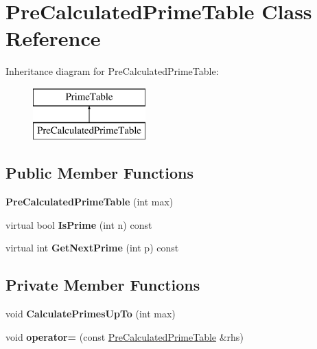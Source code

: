\hypertarget{class_pre_calculated_prime_table}{}\section{Pre\+Calculated\+Prime\+Table Class Reference}
\label{class_pre_calculated_prime_table}
Inheritance diagram for Pre\+Calculated\+Prime\+Table\+:\begin{figure}[H]
\begin{center}
\leavevmode
\includegraphics[height=2.000000cm]{class_pre_calculated_prime_table}
\end{center}
\end{figure}
\subsection*{Public Member Functions}
\begin{DoxyCompactItemize}
\item 
\mbox{\label{class_pre_calculated_prime_table_a6bb947504421e31da70d2c71576be350}} 
{\bfseries Pre\+Calculated\+Prime\+Table} (int max)
\item 
\mbox{\label{class_pre_calculated_prime_table_a8a9ab7f99b09e5e987933c260e7304cf}} 
virtual bool {\bfseries Is\+Prime} (int n) const
\item 
\mbox{\label{class_pre_calculated_prime_table_a0ff10b1fe13df7e56b8d7ed9f41d3998}} 
virtual int {\bfseries Get\+Next\+Prime} (int p) const
\end{DoxyCompactItemize}
\subsection*{Private Member Functions}
\begin{DoxyCompactItemize}
\item 
\mbox{\label{class_pre_calculated_prime_table_a393cb4947a57da9442e435eeff168b76}} 
void {\bfseries Calculate\+Primes\+Up\+To} (int max)
\item 
\mbox{\label{class_pre_calculated_prime_table_a67012c43b78cee27b891a9934becc455}} 
void {\bfseries operator=} (const \mbox{\hyperlink{class_pre_calculated_prime_table}{Pre\+Calculated\+Prime\+Table}} \&rhs)
\end{DoxyCompactItemize}
